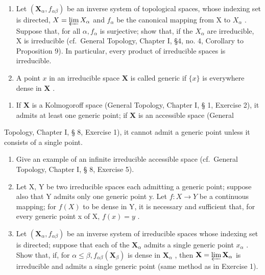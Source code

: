 
\begin{enumerate}
\def\labelenumi{\arabic{enumi}.}
\item
  Let \((\mathbf{X}_{\alpha}, f_{\alpha\beta})\) be an inverse system of topological spaces, whose indexing set is directed, \(X = \varprojlim X_{\alpha}\) and \(f_{\alpha}\) be the canonical mapping from X to \(X_{\alpha}\) . Suppose that, for all \(\alpha, f_{\alpha}\) is surjective; show that, if the \(X_{\alpha}\) are irreducible, X is irreducible (cf.~General Topology, Chapter I, §4, no. 4, Corollary to Proposition 9). In particular, every product of irreducible spaces is irreducible.
\item
  A point \(x\) in an irreducible space \(\mathbf{X}\) is called generic if \(\{x\}\) is everywhere dense in \(\mathbf{X}\) .
\end{enumerate}

\begin{enumerate}
\def\labelenumi{(\alph{enumi})}
\tightlist
\item
  If \(\mathbf{X}\) is a Kolmogoroff space (General Topology, Chapter I, § 1, Exercise 2), it admits at least one generic point; if \(\mathbf{X}\) is an accessible space (General
\end{enumerate}

Topology, Chapter I, § 8, Exercise 1), it cannot admit a generic point unless it consists of a single point.

\begin{enumerate}
\def\labelenumi{(\alph{enumi})}
\setcounter{enumi}{1}
\item
  Give an example of an infinite irreducible accessible space (cf.~General Topology, Chapter I, § 8, Exercise 5).
\item
  Let X, Y be two irreducible spaces each admitting a generic point; suppose also that Y admits only one generic point y. Let \(f: X \to Y\) be a continuous mapping; for \(f(X)\) to be dense in Y, it is necessary and sufficient that, for every generic point x of X, \(f(x) = y\) .
\item
  Let \((\mathbf{X}_{\alpha}, f_{\alpha \beta})\) be an inverse system of irreducible spaces whose indexing set is directed; suppose that each of the \(\mathbf{X}_{\alpha}\) admits a single generic point \(x_{\alpha}\) . Show that, if, for \(\alpha \leqslant \beta, f_{\alpha \beta}(\mathbf{X}_{\beta})\) is dense in \(\mathbf{X}_{\alpha}\) , then \(\mathbf{X} = \varprojlim \mathbf{X}_{\alpha}\) is irreducible and admits a single generic point (same method as in Exercise 1).
\end{enumerate}

